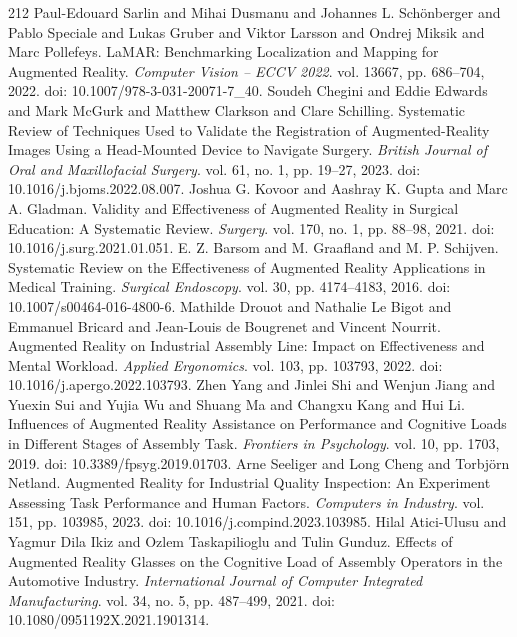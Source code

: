 \begin{thebibliography}{212}
 Paul-Edouard Sarlin and Mihai Dusmanu and Johannes L. Sch{\"o}nberger and Pablo Speciale and Lukas Gruber and Viktor Larsson and Ondrej Miksik and Marc Pollefeys. {LaMAR}: Benchmarking Localization and Mapping for Augmented Reality. \emph{Computer Vision -- ECCV 2022}. vol. 13667, pp. 686--704, 2022. doi: 10.1007/978-3-031-20071-7_40.
 Soudeh Chegini and Eddie Edwards and Mark McGurk and Matthew Clarkson and Clare Schilling. Systematic Review of Techniques Used to Validate the Registration of Augmented-Reality Images Using a Head-Mounted Device to Navigate Surgery. \emph{British Journal of Oral and Maxillofacial Surgery}. vol. 61, no. 1, pp. 19--27, 2023. doi: 10.1016/j.bjoms.2022.08.007.
 Joshua G. Kovoor and Aashray K. Gupta and Marc A. Gladman. Validity and Effectiveness of Augmented Reality in Surgical Education: A Systematic Review. \emph{Surgery}. vol. 170, no. 1, pp. 88--98, 2021. doi: 10.1016/j.surg.2021.01.051.
 E. Z. Barsom and M. Graafland and M. P. Schijven. Systematic Review on the Effectiveness of Augmented Reality Applications in Medical Training. \emph{Surgical Endoscopy}. vol. 30, pp. 4174--4183, 2016. doi: 10.1007/s00464-016-4800-6.
 Mathilde Drouot and Nathalie Le Bigot and Emmanuel Bricard and Jean-Louis de Bougrenet and Vincent Nourrit. Augmented Reality on Industrial Assembly Line: Impact on Effectiveness and Mental Workload. \emph{Applied Ergonomics}. vol. 103, pp. 103793, 2022. doi: 10.1016/j.apergo.2022.103793.
 Zhen Yang and Jinlei Shi and Wenjun Jiang and Yuexin Sui and Yujia Wu and Shuang Ma and Changxu Kang and Hui Li. Influences of Augmented Reality Assistance on Performance and Cognitive Loads in Different Stages of Assembly Task. \emph{Frontiers in Psychology}. vol. 10, pp. 1703, 2019. doi: 10.3389/fpsyg.2019.01703.
 Arne Seeliger and Long Cheng and Torbj{\"o}rn Netland. Augmented Reality for Industrial Quality Inspection: An Experiment Assessing Task Performance and Human Factors. \emph{Computers in Industry}. vol. 151, pp. 103985, 2023. doi: 10.1016/j.compind.2023.103985.
 Hilal Atici-Ulusu and Yagmur Dila Ikiz and Ozlem Taskapilioglu and Tulin Gunduz. Effects of Augmented Reality Glasses on the Cognitive Load of Assembly Operators in the Automotive Industry. \emph{International Journal of Computer Integrated Manufacturing}. vol. 34, no. 5, pp. 487--499, 2021. doi: 10.1080/0951192X.2021.1901314.

\end{thebibliography}
